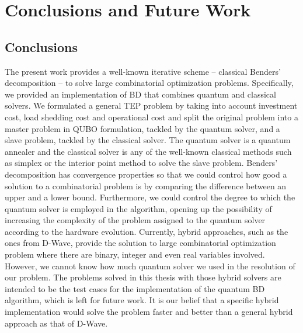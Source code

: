 
\chapter{Conclusions and Future Work} %

\label{Chapter6} %




\section{Conclusions}
The present work provides a well-known iterative scheme -- classical Benders' decomposition -- to solve large combinatorial optimization problems. Specifically, we provided an implementation of BD that combines quantum and classical solvers. We formulated a general TEP problem by taking into account investment cost, load shedding cost and operational cost and split the original problem into a master problem in QUBO formulation, tackled by the quantum solver, and a slave problem, tackled by the classical solver. The quantum solver is a quantum annealer and the classical solver is any of the well-known classical methods such as simplex or the interior point method to solve the slave problem. Benders' decomposition has convergence properties so that we could control how good a solution to a combinatorial problem is by comparing the difference between an upper and a lower bound. Furthermore, we could control the degree to which the quantum solver is employed in the algorithm, opening up the possibility of increasing the complexity of the problem assigned to the quantum solver according to the hardware evolution. Currently, hybrid approaches, such as the ones from D-Wave, provide the solution to large combinatorial optimization problem where there are binary, integer and even real variables involved. However, we cannot know how much quantum solver we used in the resolution of our problem. The problems solved in this thesis with those hybrid solvers are intended to be the test cases for the implementation of the quantum BD algorithm, which is left for future work. It is our belief that a specific hybrid implementation would solve the problem faster and better than a general hybrid approach as that of D-Wave.\\\\
